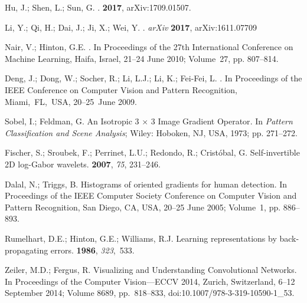 \documentclass[futureinternet,article,accept,moreauthors,pdftex,10pt,a4paper]{Definitions/mdpi}
\begin{document}
\begin{thebibliography}{999}
{Hu}, J.; {Shen}, L.; {Sun}, G.
.
 {\bf 2017},
\newblock arXiv:1709.01507.

Li, Y.; Qi, H.; Dai, J.; Ji, X.; Wei, Y.
.  \emph{arXiv} \textbf{2017}, arXiv:1611.07709


Nair, V.; Hinton, G.E.
. In Proceedings of the 27th International Conference on Machine Learning, Haifa, Israel,  21--24 June  2010; Volume~27, pp. 807--814.


Deng, J.; Dong, W.; Socher, R.; Li, L.J.; Li, K.; Fei-Fei, L.
. In {Proceedings of the IEEE Conference on Computer Vision and Pattern Recognition,} Miami,~FL,~USA, 20--25~June 2009.


Sobel, I.; Feldman, G.
\newblock An Isotropic 3 $\times$ 3 Image Gradient {Operator}. In \emph{Pattern Classification and Scene Analysis};  Wiley: Hoboken, NJ, USA, 1973; pp. 271--272.

Fischer, S.; Sroubek, F.; Perrinet, L.U.; Redondo, R.; Crist{\'o}bal, G.
\newblock Self-invertible 2{D} log-{G}abor wavelets.
 {\bf 2007}, \emph{75}, 231--246.

Dalal, N.; Triggs, B.
\newblock Histograms of oriented gradients for human detection.
\newblock  In {Proceedings of the IEEE  Computer Society Conference on} Computer Vision and Pattern Recognition,  San Diego, CA, USA,  20--25 June 2005; Volume~1, pp. 886--893.


Rumelhart, D.E.; Hinton, G.E.; Williams, R.J.
\newblock Learning representations by back-propagating errors.
 {\bf 1986}, {\em 323},~533.

Zeiler, M.D.; Fergus, R.
\newblock Visualizing and Understanding Convolutional Networks. In {Proceedings of the Computer Vision---ECCV 2014}, Zurich, Switzerland, 6--12 September 2014; {Volume 8689}, pp.~818--833, doi:{10.1007/978-3-319-10590-1\_53}.



\end{thebibliography}
\end{document}
